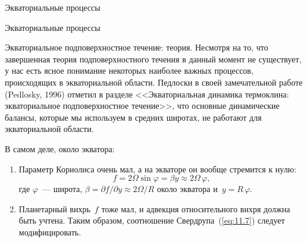 \begin{chapter}{Экваториальные процессы}
\begin{section}{Экваториальные процессы}
\begin{paragraph}{Экваториальное подповерхностное течение: теория.}
%
Несмотря на то, что завершенная теория подповерхностного течения в данный
момент не существует, у нас есть ясное
понимание некоторых наиболее важных процессов, происходящих в
экваториальной области. Педлоски в своей замечательной работе (Pedlosky, 1996)
отметил в разделе <<Экваториальная динамика термоклина: экваториальное 
подповерхностное течение>>, что основные динамические балансы, которые мы
используем в средних широтах, не работают для экваториальной области.
%

В самом деле, около экватора:
\begin{enumerate}
\item
Параметр Кориолиса очень мал, 
а на экваторе он вообще стремится к нулю:
\begin{equation}
 f=2\Omega \sin\varphi = \beta y \approx 2\Omega \,\varphi,
\end{equation}
где $\varphi$~--- широта, $\beta = \partial f/\partial y \approx 2\Omega/R$ 
около экватора и~$y=R\,\varphi$.
%

\item
Планетарный вихрь~$f$ тоже мал, и адвекция относительного
вихря должна быть учтена. Таким образом, соотношение Свердрупа~(\ref{eq:11.7}) 
следует модифицировать.
%


\end{enumerate}
\end{paragraph}
\end{section}
\end{chapter}

